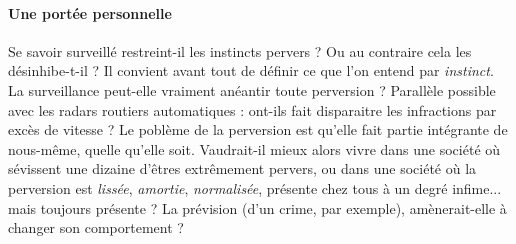 \paragraph{Une portée personnelle} Se savoir surveillé restreint-il les instincts pervers ?
Ou au contraire cela les désinhibe-t-il ? Il convient avant tout de définir ce que l'on
entend par \emph{instinct}. La surveillance peut-elle vraiment anéantir toute perversion ?
Parallèle possible avec les radars routiers automatiques : ont-ils fait disparaitre les
infractions par excès de vitesse ? Le poblème de la perversion est qu'elle fait partie
intégrante de nous-même, quelle qu'elle soit. Vaudrait-il mieux alors vivre dans une société
où sévissent une dizaine d'êtres extrêmement pervers, ou dans une société où la perversion
est \emph{lissée}, \emph{amortie}, \emph{normalisée}, présente chez tous à un degré infime...
mais toujours présente ? La prévision (d'un crime, par exemple), amènerait-elle à changer
son comportement ?